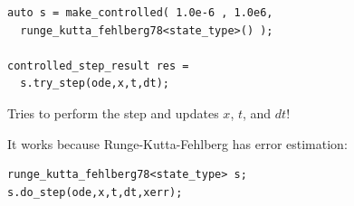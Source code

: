 \begin{frame}
 



 
\end{frame}



\begin{frame}[fragile]
 
 
 \vspace{2ex}

 \begin{lstlisting}
auto s = make_controlled( 1.0e-6 , 1.0e6,
  runge_kutta_fehlberg78<state_type>() );

controlled_step_result res = 
  s.try_step(ode,x,t,dt);
 \end{lstlisting}

 Tries to perform the step and updates $x$, $t$, and $dt$!

 \vspace{4ex}


 It works because Runge-Kutta-Fehlberg has error estimation:

 \begin{lstlisting}
runge_kutta_fehlberg78<state_type> s;
s.do_step(ode,x,t,dt,xerr);
 \end{lstlisting}


\end{frame}


